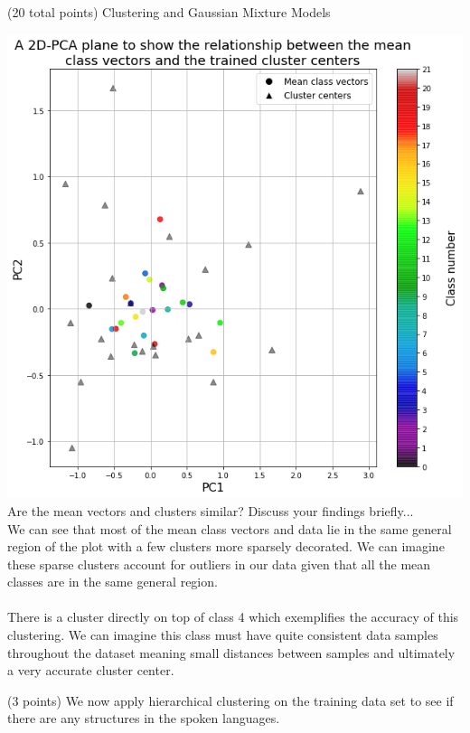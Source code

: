 \documentclass[12pt]{article}
\begin{document}
\begin{question}{(20 total points) Clustering and Gaussian Mixture Models}
\begin{subquestion}
   

      \begin{answerbox}{51em}
         \includegraphics[width=1\textwidth]{images/q32.png}
        Are the mean vectors and clusters similar? Discuss your findings briefly... \\
        We can see that most of the mean class vectors and data lie in the same general region of the plot with a few clusters more sparsely decorated. We can imagine these sparse clusters account for outliers in our data given that all the mean classes are in the same general region. \\
        \\There is a cluster directly on top of class 4 which exemplifies the accuracy of this clustering. We can imagine this class must have quite consistent data samples throughout the dataset meaning small distances between samples and ultimately a very accurate cluster center.
      \end{answerbox}
  


   \end{subquestion}
   \begin{subquestion}{(3 points)
       We now apply hierarchical clustering on the training data set
       to see if there are any structures in the spoken languages.
     } \label{Q3.3}



\end{subquestion}
\end{question}
\end{document}
